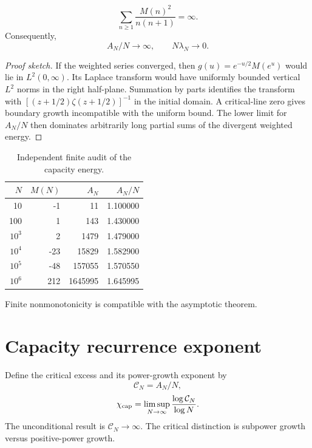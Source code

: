 \documentclass[11pt,a4paper]{article}
\begin{document}
\begin{theorem}
\begin{equation}
\sum_{n\ge1}\frac{M(n)^2}{n(n+1)}=\infty.
\end{equation}
Consequently,
\begin{equation}
\boxed{A_N/N\to\infty,\qquad N\lambda_N\to0.}
\end{equation}
\end{theorem}
\begin{proof}[Proof sketch]
If the weighted series converged, then $g(u)=e^{-u/2}M(e^u)$ would lie in $L^2(0,\infty)$. Its Laplace transform would have uniformly bounded vertical $L^2$ norms in the right half-plane. Summation by parts identifies the transform with $[(z+1/2)\zeta(z+1/2)]^{-1}$ in the initial domain. A critical-line zero gives boundary growth incompatible with the uniform bound. The lower limit for $A_N/N$ then dominates arbitrarily long partial sums of the divergent weighted energy.
\end{proof}

\begin{table}[H]\centering
\caption{Independent finite audit of the capacity energy.}
\begin{tabular}{rrrr}
\toprule
$N$ & $M(N)$ & $A_N$ & $A_N/N$\\\midrule
10 & -1 & 11 & 1.100000\\
100 & 1 & 143 & 1.430000\\
$10^3$ & 2 & 1479 & 1.479000\\
$10^4$ & -23 & 15829 & 1.582900\\
$10^5$ & -48 & 157055 & 1.570550\\
$10^6$ & 212 & 1645995 & 1.645995\\
\bottomrule
\end{tabular}
\end{table}
Finite nonmonotonicity is compatible with the asymptotic theorem.

\section{Capacity recurrence exponent}
Define the critical excess and its power-growth exponent by
\begin{equation}
\mathcal C_N=A_N/N,
\end{equation}
\begin{equation}
\chi_{\rm cap}=\limsup_{N\to\infty}\frac{\log\mathcal C_N}{\log N}.
\end{equation}
The unconditional result is $\mathcal C_N\to\infty$. The critical distinction is subpower growth versus positive-power growth.
\end{document}
